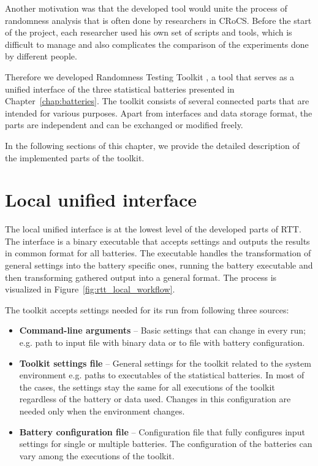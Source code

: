 \documentclass[
	digital,    %
	oneside,    %
	color,
	11pt,
	nocover,
	notable,
	nolof,
	nolot,
]{fithesis3}
\theoremstyle{definition}
\theoremstyle{remark}
\begin{document}
Another motivation was that the developed tool would unite the process of randomness analysis that is often done by researchers in CRoCS. Before the start of the project, each researcher used his own set of scripts and tools, which is difficult to manage and also complicates the comparison of the experiments done by different people.

Therefore we developed Randomness Testing Toolkit \cite{rtt-github}, a tool that serves as a unified interface of the three statistical batteries presented in Chapter~\ref{chap:batteries}. The toolkit consists of several connected parts that are intended for various purposes. Apart from interfaces and data storage format, the parts are independent and can be exchanged or modified freely. 

In the following sections of this chapter, we provide the detailed description of the implemented parts of the toolkit.

\section{Local unified interface}
The local unified interface is at the lowest level of the developed parts of RTT. The interface is a binary executable that accepts settings and outputs the results in common format for all batteries. The executable handles the transformation of general settings into the battery specific ones, running the battery executable and then transforming gathered output into a general format. The process is visualized in Figure~\ref{fig:rtt_local_workflow}.

The toolkit accepts settings needed for its run from following three sources:
\begin{itemize}
\item \textbf{Command-line arguments} -- Basic settings that can change in every run; e.g. path to input file with binary data or to file with battery configuration.
\item \textbf{Toolkit settings file} -- General settings for the toolkit related to the system environment e.g. paths to executables of the statistical batteries. In most of the cases, the settings stay the same for all executions of the toolkit regardless of the battery or data used. Changes in this configuration are needed only when the environment changes.
\item \textbf{Battery configuration file} -- Configuration file that fully configures input settings for single or multiple batteries. The configuration of the batteries can vary among the executions of the toolkit.
\end{itemize}
\end{document}

